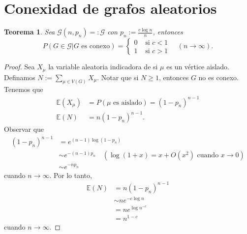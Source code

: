 \documentclass[12pt]{report}
\theoremstyle{plain}
\newtheorem{theorem}{Teorema}[section]
\theoremstyle{definition}
\begin{document}
\section{Conexidad de grafos aleatorios}

\begin{theorem}
Sea $\mathcal G (n, p_n) =: \mathcal G$ con $p_n := \frac{c \log n}{n}$, entonces
\[
    P ( G \in \mathcal G | G \text{ es conexo}) = \begin{cases}
    0 & \text{ si $c < 1$} \\
    1 & \text{ si $c > 1$}
    \end{cases} \quad (n \to \infty).
\]
\end{theorem}
\begin{proof}
Sea $X_\mu$ la variable aleatoria indicadora de si $\mu$ es un vértice aislado. Definamos $N := \sum_{\mu \in V(G)} X_\mu$. Notar que si $N \geq 1$, entonces $G$ no es conexo. Tenemos que
\begin{align*}
\mathbb{E} (X_\mu) &= P ( \mu \text{ es aislado}) = (1- p_n)^{n-1} \\
\mathbb{E} (N) &= n (1-p_n)^{n-1}.
\end{align*}
Observar que
\begin{align*}
(1-p_n)^{n-1} &= e^{(n-1) \log (1- p_n)} \\
&\sim e^{-(n-1) p_n}  \quad (\log (1 + x) = x + O(x^2) \text{ cuando $x \to 0$})\\
&\sim e^{-n p_n}
\end{align*}
cuando $n \to \infty$. Por lo tanto,
\begin{align*}
\mathbb{E} (N) &= n (1-p_n)^{n-1} \\
&\sim n e^{- c \log n} \\
&= n e^{\log n^{-c}} \\
&= n^{1-c}
\end{align*}
cuando $n \to \infty$.


\end{proof}
\end{document}
